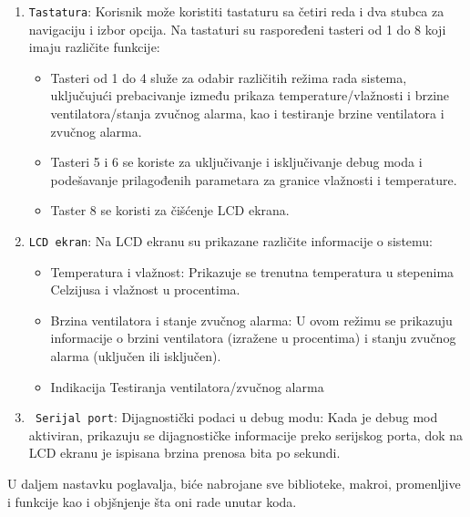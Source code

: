 \documentclass[a4paper, 12pt]{article}
\begin{document}
\begin{enumerate}

	\item \texttt{Tastatura}: Korisnik može koristiti tastaturu sa četiri reda i dva stubca za navigaciju i izbor opcija. Na tastaturi su raspoređeni tasteri od 1 do 8 koji imaju različite funkcije:
	\begin{itemize}
		\item Tasteri od 1 do 4 služe za odabir različitih režima rada sistema, uključujući prebacivanje između prikaza temperature/vlažnosti i brzine ventilatora/stanja zvučnog alarma, kao i testiranje brzine ventilatora i zvučnog alarma.
        \item Tasteri 5 i 6 se koriste za uključivanje i isključivanje debug moda i podešavanje prilagođenih parametara za granice vlažnosti i temperature.
        \item Taster 8 se koristi za čišćenje LCD ekrana.
	\end{itemize}
	
	
  	\item \texttt{LCD ekran}: Na LCD ekranu su prikazane različite informacije o sistemu:
  	\begin{itemize}
  		\item Temperatura i vlažnost: Prikazuje se trenutna temperatura u stepenima Celzijusa i vlažnost u procentima.
       	\item Brzina ventilatora i stanje zvučnog alarma: U ovom režimu se prikazuju informacije o brzini ventilatora (izražene u procentima) i stanju zvučnog alarma (uključen ili isključen).
		\item Indikacija Testiranja ventilatora/zvučnog alarma
  	\end{itemize}
  	
  	\item \texttt{ Serijal port}: Dijagnostički podaci u debug modu: Kada je debug mod aktiviran, prikazuju se dijagnostičke informacije preko serijskog porta, dok na LCD ekranu je ispisana brzina prenosa bita po sekundi.
\end{enumerate}

U daljem nastavku poglavalja, biće nabrojane sve biblioteke, makroi, promenljive i funkcije kao i objšnjenje šta oni rade unutar koda.
    
\vspace{10pt}
\end{document}
